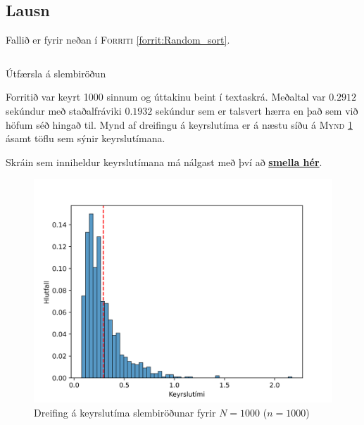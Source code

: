 \documentclass[12pt, a4paper, hidelinks]{article}
\begin{document}
\subsection*{Lausn}

Fallið er fyrir neðan í \textsc{Forriti} \ref{forrit:Random_sort}.

\begin{listing}[H]
    \centering
    \inputminted[linenos, frame=single, firstline=34, lastline=43]{java}{../src/V5/Random.java}
    \caption{Útfærsla á slembiröðun}
    \label{forrit:Random_sort}
\end{listing}

\noindent
Forritið var keyrt 1000 sinnum og úttakinu beint í textaskrá. Meðaltal var $0.2912$ sekúndur með staðalfráviki $0.1932$ sekúndur
sem er talsvert hærra en það sem við höfum séð hingað til. Mynd af dreifingu á keyrslutíma er á næstu síðu á \textsc{Mynd} \ref{mynd:Keyrslutimi_RandomSort}
ásamt töflu sem sýnir keyrslutímana.

Skráin sem inniheldur keyrslutímana má nálgast með því að \href{https://raw.githubusercontent.com/lvthnn/TOL203G/master/HD4/src/V5/data_randomsort.txt}{\bfseries smella hér}.

\begin{figure}
    \centering
    \includegraphics[width=\textwidth]{img/RandomSort_1Kints.png}
    \caption{Dreifing á keyrslutíma slembiröðunar fyrir $N = 1000$ ($n = 1000$)}
    \label{mynd:Keyrslutimi_RandomSort}
\end{figure}

\newpage
\end{document}

